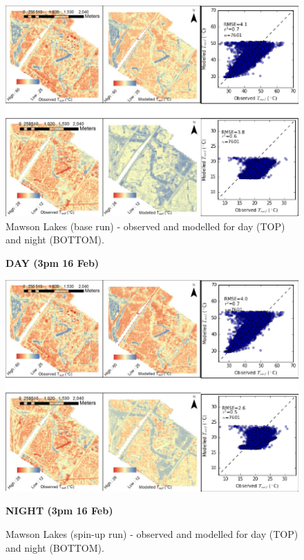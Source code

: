 \documentclass[final,3p,times,authoryear]{elsarticle}
\begin{document}
\begin{figure}[!htbp]
\includegraphics[trim=0mm 0mm 0mm 0mm, clip,scale=1.05]{images/MawsonBase.png}
 \caption{Mawson Lakes (base run) - observed  and modelled  for day (TOP) and night (BOTTOM).} \label{fig:MawsonBase}
\end{figure}

 


\begin{figure}[!htbp]
\begin{center}
\textbf{{\Large DAY (3pm 16 Feb)}}
\end{center}
\includegraphics[trim=0mm 0mm 0mm 0mm, clip,scale=1.05]{images/MawsonSpin.png}
\begin{center}
\textbf{{\Large NIGHT (3pm 16 Feb)}}
\end{center}
 \caption{Mawson Lakes (spin-up  run) - observed  and modelled  for day (TOP) and night (BOTTOM).} \label{fig:MawsonSpin}
\end{figure}
\end{document}
